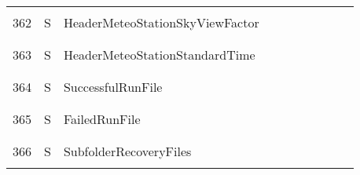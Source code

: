 \begin{longtable}{|c|c|l|c|c|c|c|p{}|c|p{}|}
&&&&&&&&&\\\hline%
&&&&&&&&&\\
362 & S & HeaderMeteoStationSkyViewFactor & & & & & & & \\
&&&&&&&&&\\\hline%
&&&&&&&&&\\
363 & S & HeaderMeteoStationStandardTime & & & & & & & \\
&&&&&&&&&\\\hline%
&&&&&&&&&\\
364 & S & SuccessfulRunFile & & & & & & & \\
&&&&&&&&&\\\hline%
&&&&&&&&&\\
365 & S & FailedRunFile & & & & & & & \\
&&&&&&&&&\\\hline%
&&&&&&&&&\\
366 & S & SubfolderRecoveryFiles & & & & & & & \\
&&&&&&&&&\\\hline%
\end{longtable}
